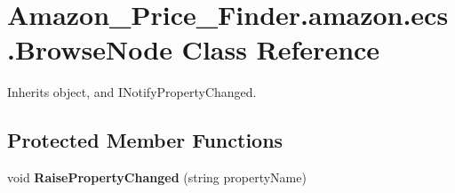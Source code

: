 \hypertarget{class_amazon___price___finder_1_1amazon_1_1ecs_1_1_browse_node}{\section{Amazon\-\_\-\-Price\-\_\-\-Finder.\-amazon.\-ecs.\-Browse\-Node Class Reference}
\label{class_amazon___price___finder_1_1amazon_1_1ecs_1_1_browse_node}
}


 




Inherits object, and I\-Notify\-Property\-Changed.

\subsection*{Protected Member Functions}
\begin{DoxyCompactItemize}
\item 
\hypertarget{class_amazon___price___finder_1_1amazon_1_1ecs_1_1_browse_node_a425dafea097e1926717a4846dca57650}{void {\bfseries Raise\-Property\-Changed} (string property\-Name)}\label{class_amazon___price___finder_1_1amazon_1_1ecs_1_1_browse_node_a425dafea097e1926717a4846dca57650}

\end{DoxyCompactItemize}
